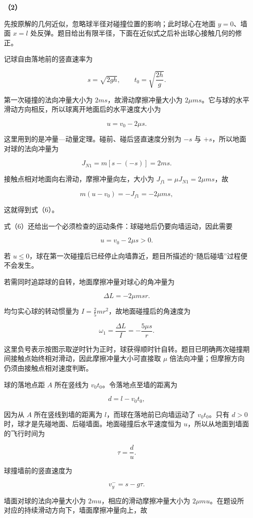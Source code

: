 \documentclass[12pt,a4paper,UTF8]{ctexart}
\begin{document}
\textbf{（2）}

先按原解的几何近似，忽略球半径对碰撞位置的影响；此时球心在地面
\(y=0\)、墙面 \(x=l\)
处反弹。题目给出有限半径，下面在近似式之后补出球心接触几何的修正。

记球自由落地前的竖直速率为

\[s=\sqrt{2gh},\qquad t_0=\sqrt{\frac{2h}{g}}.\]

第一次碰撞的法向冲量大小为 \(2ms\)，故滑动摩擦冲量大小为
\(2\mu ms\)。它与球的水平滑动方向相反，所以球离开地面后的水平速度大小为

\[u=v_0-2\mu s. \tag{6}\]

这里用到的是冲量---动量定理。碰前、碰后竖直速度分别为 \(-s\) 与
\(+s\)，所以地面对球的法向冲量为

\[J_{N1}=m[s-(-s)]=2ms.\]

接触点相对地面向右滑动，摩擦冲量向左，大小为
\(J_{f1}=\mu J_{N1}=2\mu ms\)，故

\[m(u-v_0)=-J_{f1}=-2\mu ms,\]

这就得到式（6）。

式（6）还给出一个必须检查的运动条件：球碰地后仍要向墙运动，因此需要

\[u=v_0-2\mu s>0.\]

若
\(u\leq0\)，球在第一次碰撞后已经停止向墙靠近，题目所描述的``随后碰墙''过程便不会发生。

若需同时追踪球的自转，地面摩擦冲量对球心的角冲量为

\[\Delta L=-2\mu msr.\]

均匀实心球的转动惯量为 \(I=\frac25mr^2\)，故地面碰撞后的角速度为

\[\omega_1=\frac{\Delta L}{I}
=-\frac{5\mu s}{r}.\]

这里负号表示按图示取逆时针为正时，球获得顺时针自转。题目已明确两次碰撞期间接触点始终相对滑动，因此摩擦冲量大小可直接取
\(\mu\) 倍法向冲量；但摩擦方向仍须由接触点相对速度判断。

球的落地点距 \(A\) 所在竖线为 \(v_0t_0\)。令落地点至墙的距离为

\[d=l-v_0t_0,\]

因为从 \(A\) 所在竖线到墙的距离为 \(l\)，而球在落地前已向墙运动了
\(v_0t_0\)。只有 \(d>0\)
时，球才是先碰地面、后碰墙面。地面碰撞后水平速度恒为
\(u\)，所以从地面到墙面的飞行时间为

\[\tau=\frac{d}{u}. \tag{7}\]

球撞墙前的竖直速度为

\[v_y^-=s-g\tau.\]

墙面对球的法向冲量大小为 \(2mu\)，相应的滑动摩擦冲量大小为
\(2\mu m u\)。在题设所对应的持续滑动方向下，墙面摩擦冲量向上，故
\end{document}
